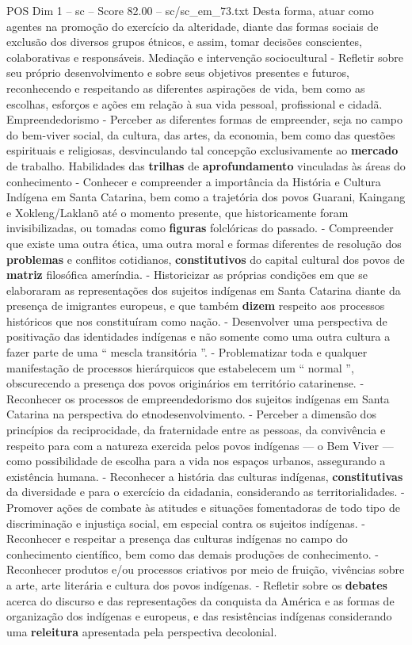 \begin{textsample}{POS Dim 1 – sc – Score 82.00 – sc/sc\_em\_73.txt}
Desta forma, atuar como agentes na promoção do exercício da alteridade, diante das formas sociais de exclusão dos diversos grupos étnicos, e assim, tomar decisões conscientes, colaborativas e responsáveis.
Mediação e intervenção sociocultural - Refletir sobre seu próprio desenvolvimento e sobre seus objetivos presentes e futuros, reconhecendo e respeitando as diferentes aspirações de vida, bem como as escolhas, esforços e ações em relação à sua vida pessoal, profissional e cidadã.
Empreendedorismo - Perceber as diferentes formas de empreender, seja no campo do bem-viver social, da cultura, das artes, da economia, bem como das questões espirituais e religiosas, desvinculando tal concepção exclusivamente ao \textbf{mercado} de trabalho.
Habilidades das \textbf{trilhas} de \textbf{aprofundamento} vinculadas às áreas do conhecimento - Conhecer e compreender a importância da História e Cultura Indígena em Santa Catarina, bem como a trajetória dos povos Guarani, Kaingang e Xokleng/Laklanõ até o momento presente, que historicamente foram invisibilizadas, ou tomadas como \textbf{figuras} folclóricas do passado. - Compreender que existe uma outra ética, uma outra moral e formas diferentes de resolução dos \textbf{problemas} e conflitos cotidianos, \textbf{constitutivos} do capital cultural dos povos de \textbf{matriz} filosófica ameríndia. - Historicizar as próprias condições em que se elaboraram as representações dos sujeitos indígenas em Santa Catarina diante da presença de imigrantes europeus, e que também \textbf{dizem} respeito aos processos históricos que nos constituíram como nação. - Desenvolver uma perspectiva de positivação das identidades indígenas e não somente como uma outra cultura a fazer parte de uma “ mescla transitória ”. - Problematizar toda e qualquer manifestação de processos hierárquicos que estabelecem um “ normal ”, obscurecendo a presença dos povos originários em território catarinense. - Reconhecer os processos de empreendedorismo dos sujeitos indígenas em Santa Catarina na perspectiva do etnodesenvolvimento. - Perceber a dimensão dos princípios da reciprocidade, da fraternidade entre as pessoas, da convivência e respeito para com a natureza exercida pelos povos indígenas — o Bem Viver — como possibilidade de escolha para a vida nos espaços urbanos, assegurando a existência humana. - Reconhecer a história das culturas indígenas, \textbf{constitutivas} da diversidade e para o exercício da cidadania, considerando as territorialidades. - Promover ações de combate às atitudes e situações fomentadoras de todo tipo de discriminação e injustiça social, em especial contra os sujeitos indígenas. - Reconhecer e respeitar a presença das culturas indígenas no campo do conhecimento científico, bem como das demais produções de conhecimento. - Reconhecer produtos e/ou processos criativos por meio de fruição, vivências sobre a arte, arte literária e cultura dos povos indígenas. - Refletir sobre os \textbf{debates} acerca do discurso e das representações da conquista da América e as formas de organização dos indígenas e europeus, e das resistências indígenas considerando uma \textbf{releitura} apresentada pela perspectiva decolonial.

\end{textsample}
